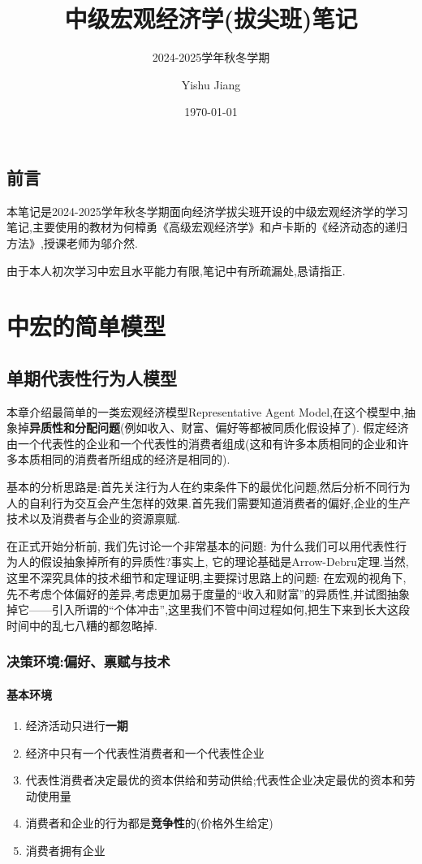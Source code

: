 \documentclass[lang=cn,10pt]{elegantbook}
\title{中级宏观经济学(拔尖班)笔记}
\subtitle{2024-2025学年秋冬学期}
\author{Yishu Jiang}
\institute{School of Economics,Zhejiang University}
\date{\today}
\begin{document}
\maketitle
\frontmatter
\chapter*{前言}
{\fangsong 
    本笔记是2024-2025学年秋冬学期面向经济学拔尖班开设的中级宏观经济学的学习笔记,主要使用的教材为何樟勇《高级宏观经济学》和卢卡斯的《经济动态的递归方法》,授课老师为邬介然.

    由于本人初次学习中宏且水平能力有限,笔记中有所疏漏处,恳请指正.
}
\newpage

\tableofcontents

\mainmatter
\part{中宏的简单模型}
\chapter{单期代表性行为人模型}
本章介绍最简单的一类宏观经济模型Representative Agent Model,在这个模型中,抽象掉\textbf{异质性和分配问题}(例如收入、财富、偏好等都被同质化假设掉了).
假定经济由一个代表性的企业和一个代表性的消费者组成(这和有许多本质相同的企业和许多本质相同的消费者所组成的经济是相同的).

基本的分析思路是:首先关注行为人在约束条件下的最优化问题,然后分析不同行为人的自利行为交互会产生怎样的效果.首先我们需要知道消费者的偏好,企业的生产技术以及消费者与企业的资源禀赋.

在正式开始分析前, 我们先讨论一个非常基本的问题: 为什么我们可以用代表性行为人的假设抽象掉所有的异质性?事实上, 它的理论基础是Arrow-Debru定理.当然,这里不深究具体的技术细节和定理证明,主要探讨思路上的问题:
在宏观的视角下,先不考虑个体偏好的差异,考虑更加易于度量的“收入和财富”的异质性,并试图抽象掉它——引入所谓的“个体冲击”,这里我们不管中间过程如何,把生下来到长大这段时间中的乱七八糟的都忽略掉.
\section{决策环境:偏好、禀赋与技术}
\subsection{基本环境}
\begin{enumerate}
    \item 经济活动只进行\textbf{一期}
    \item 经济中只有一个代表性消费者和一个代表性企业
    \item 代表性消费者决定最优的资本供给和劳动供给;代表性企业决定最优的资本和劳动使用量
    \item 消费者和企业的行为都是\textbf{竞争性}的(价格外生给定)
    \item 消费者拥有企业
\end{enumerate}
\end{document}
